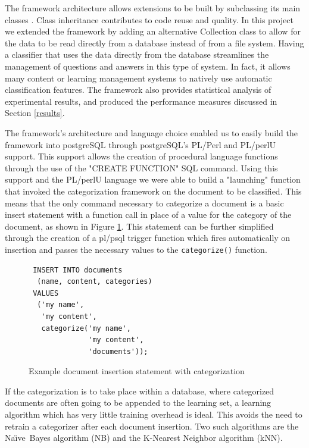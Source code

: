 \documentclass{article}
\newcommand{\naive}{Na\"\i ve}
\newcommand{\method}[1]{\texttt{#1()}}
\begin{document}
The framework architecture allows extensions to be built by subclassing
its main classes \cite{williams:02}. Class inheritance contributes to code reuse and 
quality.
In this project we extended the framework by adding an alternative
Collection class to allow for the data to be read directly from a database instead of from a file system.  
Having a classifier that uses the data directly from the database
streamlines the management of questions and answers in this type of
system. In fact, it allows many content or learning management systems
to natively use automatic classification features.
The framework also provides statistical analysis of experimental results, and 
produced the performance measures discussed in Section \ref{results}.

The framework's architecture and language choice enabled us to easily build the 
framework into postgreSQL through postgreSQL's PL/Perl and PL/perlU support. 
This support allows the creation of procedural language functions through the use of 
the "CREATE FUNCTION" SQL command. Using this support and the PL/perlU language 
we were able to build a "launching" function that invoked the categorization 
framework on the document to be classified. This means that the only command 
necessary to categorize a document is a basic insert statement with a function call in 
place of a value for the category of the document, as shown in Figure \ref{sql-insert}.
This statement can be further simplified through the creation of a pl/psql 
trigger function which fires automatically on insertion and passes the necessary values 
to the \method{categorize} function.

\begin{figure}
\begin{verbatim}
 INSERT INTO documents
  (name, content, categories) 
 VALUES
  ('my name',
   'my content',
   categorize('my name',
              'my content',
              'documents'));
\end{verbatim}
\caption{Example document insertion statement with categorization}
\label{sql-insert}
\end{figure}

If the categorization is to take place within a database, where
categorized documents are often going to be appended to the learning
set, a learning algorithm which has very little training overhead is
ideal.  This avoids the need to retrain a categorizer after each
document insertion.  Two such algorithms are the \naive\ Bayes
algorithm (NB) and the K-Nearest Neighbor algorithm (kNN).
\end{document}

